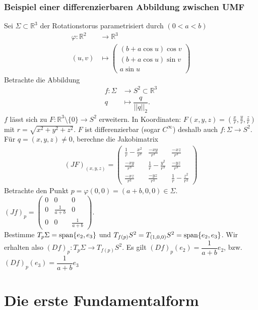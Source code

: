 \documentclass[../main.tex]{subfiles}
\begin{document}
\subsubsection{Beispiel einer differenzierbaren Abbildung zwischen UMF}
Sei $\Sigma \subset \mathbb{R}^3$ der Rotationstorus parametrisiert durch $(0 < a < b)$
\begin{align*}
    \varphi : \mathbb{R}^2 & \to \mathbb{R}^3 \\
    (u,v) & \mapsto \begin{pmatrix}
    (b+a \cos u )\cos v \\ (b + a \cos u ) \sin v \\ a \sin u
    \end{pmatrix}
\end{align*} Betrachte die Abbildung 
\begin{align*}
    f : \Sigma & \to S^2 \subset \mathbb{R}^3\\
    q & \mapsto \dfrac{q}{||q||_2}.  
\end{align*}  $f$ lässt sich zu $F : \mathbb{R}^3 \setminus \{0\} \to S^2$
 erweitern. In Koordinaten: $F(x,y,z) = \left( \frac{x}{r}, \frac{y}{r}, \frac{z}{r} \right)$ mit $r = \sqrt{x^2+y^2+z^2}$. $F$ ist differenzierbar (sogar $C^{\infty}$) deshalb auch $f : \Sigma \to S^2$.
 Für $q=(x,y,z) \not = 0$, berechne die Jakobimatrix
 \begin{align*}
     (JF)_{(x,y,z)}=\begin{pmatrix}
     \frac{1}{r} - \frac{x^2}{r^3} & \frac{-xy}{r^3} & \frac{-xz}{r^3} \\
     \frac{-xy}{r^3} & \frac{1}{r}-\frac{y^2}{r^3} & \frac{-yz}{r^3} \\
     \frac{-xz}{r^3} & \frac{-yz}{r^3} & \frac{1}{r}-\frac{z^2}{r^3}
     \end{pmatrix}
 \end{align*}
Betrachte den Punkt $p = \varphi (0,0) = (a+b,0,0) \in \Sigma$.
$(Jf)_p=\left(\begin{smallmatrix} 0 & 0 & 0 \\ 0 & \frac{1}{a+b} & 0 \\ 0 & 0 & \frac{1}{a+b}\end{smallmatrix}\right)$. \\
Bestimme $T_p\Sigma = \operatorname{span}\{e_2,e_3\}$ und
$T_{f(p)}S^2 = T_{(1,0,0)}S^2 = \operatorname{span}\{e_2,e_3\}$. Wir erhalten also
$(Df)_p : T_p\Sigma \to T_{f(p)}S^2$.
Es gilt $(Df)_p(e_2)= \dfrac{1}{a+b}e_2$, bzw. $(Df)_p(e_3)= \dfrac{1}{a+b}e_3$ 


\section{Die erste Fundamentalform}
\end{document}
